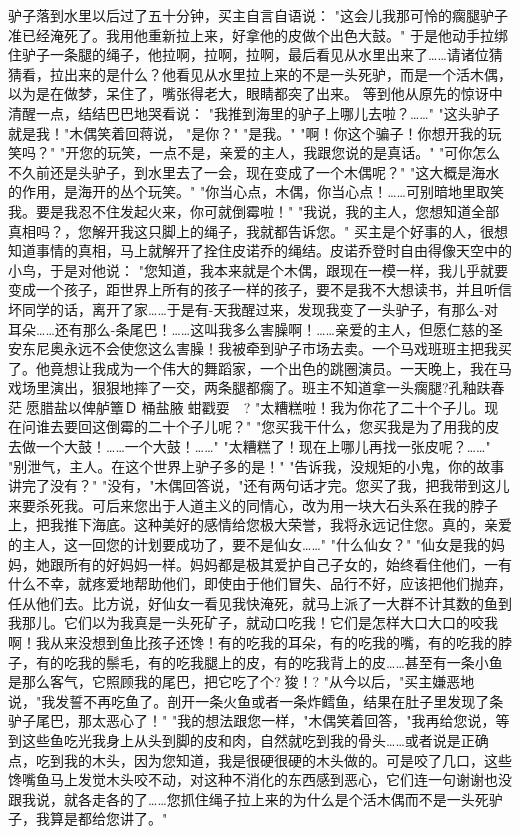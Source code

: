 \documentclass[12pt,UTF8]{ctexbook}
\begin{document}
驴子落到水里以后过了五十分钟，买主自言自语说：
"这会儿我那可怜的瘸腿驴子准已经淹死了。我用他重新拉上来，好拿他的皮做个出色大鼓。"
于是他动手拉绑住驴子一条腿的绳子，他拉啊，拉啊，拉啊，最后看见从水里出来了……请诸位猜猜看，拉出来的是什么？他看见从水里拉上来的不是一头死驴，而是一个活木偶，以为是在做梦，呆住了，嘴张得老大，眼睛都突了出来。
等到他从原先的惊讶中清醒一点，结结巴巴地哭看说：
"我推到海里的驴子上哪儿去啦？……"
"这头驴子就是我！"木偶笑着回蒋说，
"是你？"
"是我。"
"啊！你这个骗子！你想开我的玩笑吗？"
"开您的玩笑，一点不是，亲爱的主人，我跟您说的是真话。"
"可你怎么不久前还是头驴子，到水里去了一会，现在变成了一个木偶呢？"
"这大概是海水的作用，是海开的丛个玩笑。"
"你当心点，木偶，你当心点！……可别暗地里取笑我。要是我忍不住发起火来，你可就倒霉啦！"
"我说，我的主人，您想知道全部真相吗？，您解开我这只脚上的绳子，我就都告诉您。"
买主是个好事的人，很想知道事情的真相，马上就解开了拴住皮诺乔的绳结。皮诺乔登时自由得像天空中的小鸟，于是对他说：
"您知道，我本来就是个木偶，跟现在一模一样，我儿乎就要变成一个孩子，距世界上所有的孩子一样的孩子，要不是我不大想读书，并且听信坏同学的话，离开了家……于是有-天我醒过来，发现我变了一头驴子，有那么-对耳朵……还有那么-条尾巴！……这叫我多么害臊啊！……亲爱的主人，但愿仁慈的圣安东尼奥永远不会使您这么害臊！我被牵到驴子市场去卖。一个马戏班班主把我买了。他竟想让我成为一个伟大的舞蹈家，一个出色的跳圈演员。一天晚上，我在马戏场里演出，狠狠地摔了一交，两条腿都瘸了。班主不知道拿一头瘸腿?孔釉趺春茫愿腊盐以俾舻簟Ｄ桶盐腋蚶戳耍　?
"太糟糕啦！我为你花了二十个子儿。现在问谁去要回这倒霉的二十个子儿呢？"
"您买我干什么，您买我是为了用我的皮去做一个大鼓！……一个大鼓！……"
"太糟糕了！现在上哪儿再找一张皮呢？……"
"别泄气，主人。在这个世界上驴子多的是！"
"告诉我，没规矩的小鬼，你的故事讲完了没有？"
"没有，"木偶回答说，"还有两句话才完。您买了我，把我带到这儿来要杀死我。可后来您出于人道主义的同情心，改为用一块大石头系在我的脖子上，把我推下海底。这种美好的感情给您极大荣誉，我将永远记住您。真的，亲爱的主人，这一回您的计划要成功了，要不是仙女……"
"什么仙女？"
"仙女是我的妈妈，她跟所有的好妈妈一样。妈妈都是极其爱护自己子女的，始终看住他们，一有什么不幸，就疼爱地帮助他们，即使由于他们冒失、品行不好，应该把他们抛弃，任从他们去。比方说，好仙女一看见我快淹死，就马上派了一大群不计其数的鱼到我那儿。它们以为我真是一头死矿子，就动口吃我！它们是怎样大口大口的咬我啊！我从来没想到鱼比孩子还馋！有的吃我的耳朵，有的吃我的嘴，有的吃我的脖子，有的吃我的鬃毛，有的吃我腿上的皮，有的吃我背上的皮……甚至有一条小鱼是那么客气，它照顾我的尾巴，把它吃了个?狻！?
"从今以后，"买主嫌恶地说，"我发誓不再吃鱼了。剖开一条火鱼或者一条炸鳕鱼，结果在肚子里发现了条驴子尾巴，那太恶心了！"
"我的想法跟您一样，"木偶笑着回答，"我再给您说，等到这些鱼吃光我身上从头到脚的皮和肉，自然就吃到我的骨头……或者说是正确点，吃到我的木头，因为您知道，我是很硬很硬的木头做的。可是咬了几口，这些馋嘴鱼马上发觉木头咬不动，对这种不消化的东西感到恶心，它们连一句谢谢也没跟我说，就各走各的了……您抓住绳子拉上来的为什么是个活木偶而不是一头死驴子，我算是都给您讲了。"
\end{document}

